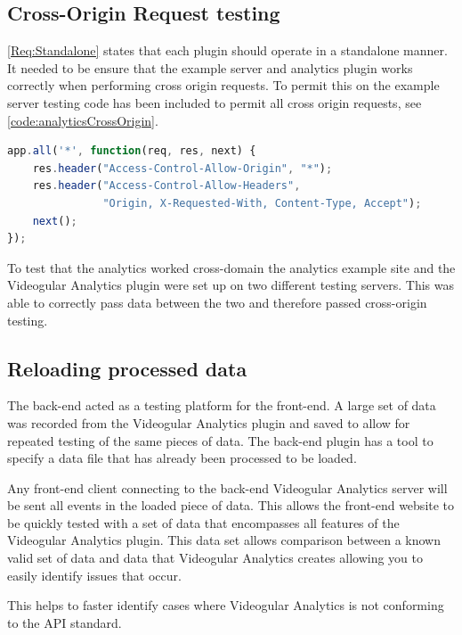 \subsection{Cross-Origin Request testing}

\cref{Req:Standalone} states that each plugin should operate in a standalone manner. It needed to be ensure that the example server and analytics plugin works correctly when performing cross origin requests. To permit this on the example server testing code has been included to permit all cross origin requests, see \autoref{code:analyticsCrossOrigin}.

\begin{lstlisting}[language=javascript,caption={Code showing appending Cross Origin headers to all responses}, label={code:analyticsCrossOrigin}]
app.all('*', function(req, res, next) {
	res.header("Access-Control-Allow-Origin", "*");
	res.header("Access-Control-Allow-Headers",
	           "Origin, X-Requested-With, Content-Type, Accept");
	next();
});
\end{lstlisting}

To test that the analytics worked cross-domain the analytics example site and the Videogular Analytics plugin were set up on two different testing servers. This was able to correctly pass data between the two and therefore passed cross-origin testing.

\subsection{Reloading processed data}
\label{Section:reloading processed data}

The back-end acted as a testing platform for the front-end. A large set of data was recorded from the Videogular Analytics plugin and saved to allow for repeated testing of the same pieces of data. The back-end plugin has a tool to specify a data file that has already been processed to be loaded.

Any front-end client connecting to the back-end \gls{Videogular} Analytics server will be sent all events in the loaded piece of data. This allows the front-end website to be quickly tested with a set of data that encompasses all features of the \gls{Videogular} Analytics plugin. This data set allows comparison between a known valid set of data and data that \gls{Videogular} Analytics creates allowing you to easily identify issues that occur.

This helps to faster identify cases where \gls{Videogular} Analytics is not conforming to the \gls{API} standard.

